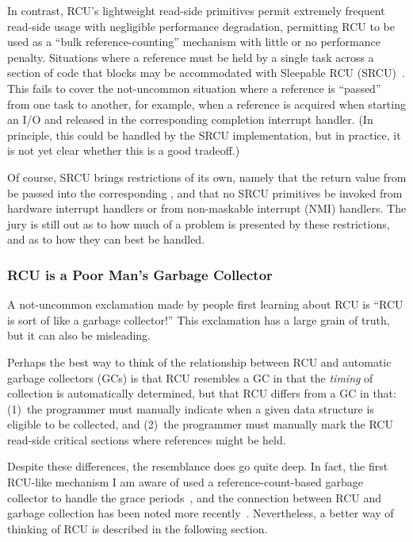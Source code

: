 In contrast, RCU's lightweight read-side primitives permit
extremely frequent read-side usage with negligible performance
degradation, permitting RCU to be used as a ``bulk reference-counting''
mechanism with little or no performance penalty.
Situations where a reference must be held by a single task across a
section of code that blocks may be accommodated with
Sleepable RCU (SRCU)~\cite{PaulEMcKenney2006c}.
This fails to cover the not-uncommon situation where a reference is ``passed''
from one task to another, for example, when a reference is acquired
when starting an I/O and released in the corresponding completion
interrupt handler.
(In principle, this could be handled by the SRCU implementation,
but in practice, it is not yet clear whether this is a good tradeoff.)

Of course, SRCU brings restrictions of its own, namely that the
return value from  be passed into the
corresponding , and that no SRCU primitives
be invoked from hardware interrupt handlers or from non-maskable interrupt
(NMI) handlers.
The jury is still out as to how much of a problem is presented by
these restrictions, and as to how they can best be handled.

\subsubsection{RCU is a Poor Man's Garbage Collector}
\label{sec:defer:RCU is a Poor Man's Garbage Collector}

A not-uncommon exclamation made by people first learning about
RCU is ``RCU is sort of like a garbage collector!''
This exclamation has a large grain of truth, but it can also be
misleading.

Perhaps the best way to think of the relationship between RCU
and automatic garbage collectors (GCs) is that RCU resembles
a GC in that the \emph{timing} of collection is automatically
determined, but that RCU differs from a GC in that: (1)~the programmer
must manually indicate when a given data structure is eligible
to be collected, and (2)~the programmer must manually mark the
RCU read-side critical sections where references might be held.

Despite these differences, the resemblance does go quite deep.
In fact, the first RCU-like mechanism I am aware of used a
reference-count-based garbage collector to handle the grace
periods~\cite{Kung80}, and the connection between RCU and
garbage collection has been noted more
recently~\cite{HarshalSheth2016goRCU}.
Nevertheless, a better way of thinking of RCU is described in the
following section.

